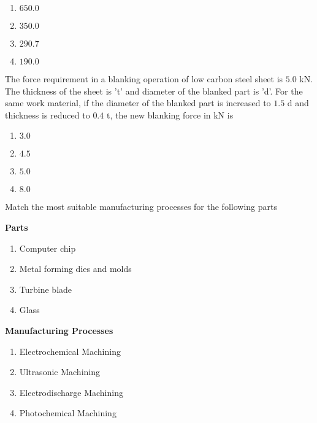      \begin{multicols}{4}
        \begin{enumerate}
            \item $650.0$
            \item $350.0$
            \item $290.7$
            \item $190.0$
        \end{enumerate}
    \end{multicols}

    \item The force requirement in a blanking operation of low carbon steel sheet is $5.0$ kN. The thickness of the sheet is 't' and diameter of the blanked part is 'd'. For the same work material, if the diameter of the blanked part is increased to $1.5$ d and thickness is reduced to $0.4$ t, the new blanking force in kN is
    \begin{multicols}{4}
        \begin{enumerate}
            \item $3.0$
            \item $4.5$
            \item $5.0$
            \item $8.0$
        \end{enumerate}
    \end{multicols}

    \item Match the most suitable manufacturing processes for the following parts
        \begin{multicols}{2}
			\textbf{Parts}
			\begin{enumerate}[label=(\Alph*)]
                
				\item Computer chip
				\item Metal forming dies and molds
                    \item Turbine blade
                    \item Glass
			\end{enumerate}
			\columnbreak
			\textbf{Manufacturing Processes}
			\begin{enumerate}[label=(\arabic*)]
				\item Electrochemical Machining
				\item Ultrasonic Machining
				\item Electrodischarge Machining
                    \item Photochemical Machining
			\end{enumerate}
		\end{multicols}

